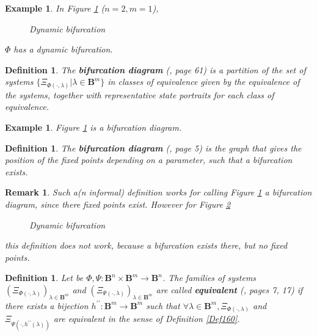 \documentclass[12pt]{article}\usepackage{amsmath}
\newtheorem{definition}[theorem]{Definition}
\newtheorem{example}[theorem]{Example}
\newtheorem{remark}[theorem]{Remark}
\begin{document}
\begin{example}
In Figure \ref{bifurcation4} ($n=2,m=1$),\begin{figure}
[ptb]
\begin{center}
\caption{Dynamic bifurcation}\label{bifurcation4}\end{center}
\end{figure}
$\Phi$ has a dynamic bifurcation.
\end{example}

\begin{definition}
The \textbf{bifurcation diagram} (\cite{bib1}, page 61) is a partition of the
set of systems $\{\Xi_{\Phi(\cdot,\lambda)}|\lambda\in\mathbf{B}^{m}\}$ in
classes of equivalence given by the equivalence of the systems, together with
representative state portraits for each class of equivalence.
\end{definition}

\begin{example}
Figure \ref{bifurcation4} is a bifurcation diagram.
\end{example}

\begin{definition}
The \textbf{bifurcation diagram} (\cite{bib3}, page 5) is the graph that gives
the position of the fixed points depending on a parameter, such that a
bifurcation exists.
\end{definition}

\begin{remark}
Such a(n informal) definition works for calling Figure \ref{bifurcation4} a
bifurcation diagram, since there fixed points exist. However for Figure
\ref{bifurcation5}
\begin{figure}
[ptb]
\begin{center}
\caption{Dynamic bifurcation}\label{bifurcation5}\end{center}
\end{figure}
this definition does not work, because a bifurcation exists there, but no
fixed points.
\end{remark}

\begin{definition}
Let be $\Phi,\Psi:\mathbf{B}^{n}\times\mathbf{B}^{m}\rightarrow\mathbf{B}^{n}$. The families of systems $(\Xi_{\Phi(\cdot,\lambda)})_{\lambda\in
\mathbf{B}^{m}}$ and $(\Xi_{\Psi(\cdot,\lambda)})_{\lambda\in\mathbf{B}^{m}}$
are called \textbf{equivalent} (\cite{bib5}, pages 7, 17) if there exists a
bijection $h^{\prime\prime}:\mathbf{B}^{m}\rightarrow\mathbf{B}^{m}$ such that
$\forall\lambda\in\mathbf{B}^{m},\Xi_{\Phi(\cdot,\lambda)}$ and $\Xi
_{\Psi(\cdot,h^{\prime\prime}(\lambda))}$ are equivalent in the sense of
Definition \ref{Def160}.
\end{definition}
\end{document}
